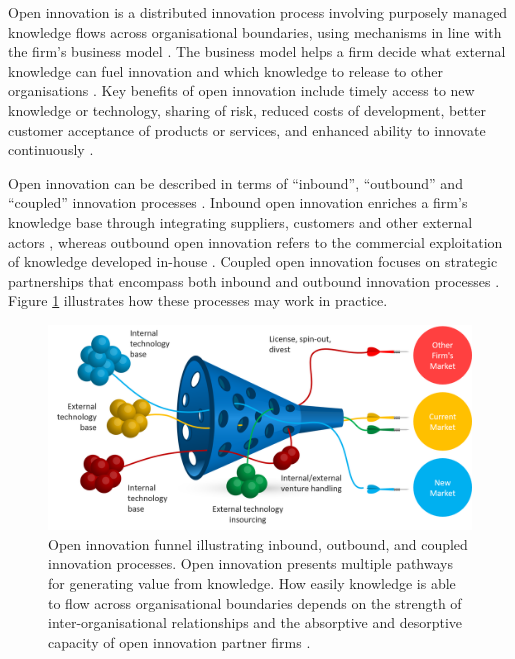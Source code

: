 Open innovation is a distributed innovation process involving purposely managed knowledge flows across organisational boundaries, using mechanisms in line with the firm's business model \citep{chesbrough2014explicating}. The business model helps a firm decide what external knowledge can fuel innovation and which knowledge to release to other organisations \citep{chesbrough2017future}. Key benefits of open innovation include timely access to new knowledge or technology, sharing of risk, reduced costs of development, better customer acceptance of products or services, and enhanced ability to innovate continuously \citep{ye2013exploring}. \medskip
 
 Open innovation can be described in terms of \enquote{inbound}, \enquote{outbound} and \enquote{coupled} innovation processes \citep{gassmann2004towards}. Inbound open innovation enriches a firm's knowledge base through integrating suppliers, customers and other external actors \citep{xu2013inbound}, whereas outbound open innovation refers to the commercial exploitation of knowledge developed in-house \citep{de2016knowledge}. Coupled open innovation focuses on strategic partnerships that encompass both inbound and outbound innovation processes \citep{spithoven2013open}. Figure \ref{fig:oi_funnel} illustrates how these processes may work in practice. \medskip
 
\begin{figure}[p]
\centering
\includegraphics[width=0.9\linewidth]{Images/oi_funnel.png}
\caption[Open innovation funnel]{Open innovation funnel illustrating inbound, outbound, and coupled innovation processes. Open innovation presents multiple pathways for generating value from knowledge. How easily knowledge is able to flow across organisational boundaries depends on the strength of inter-organisational relationships and the absorptive and desorptive capacity of open innovation partner firms \citep{chesbrough2004open,lichtenthaler2010technology}.} 
\label{fig:oi_funnel}
\end{figure}


